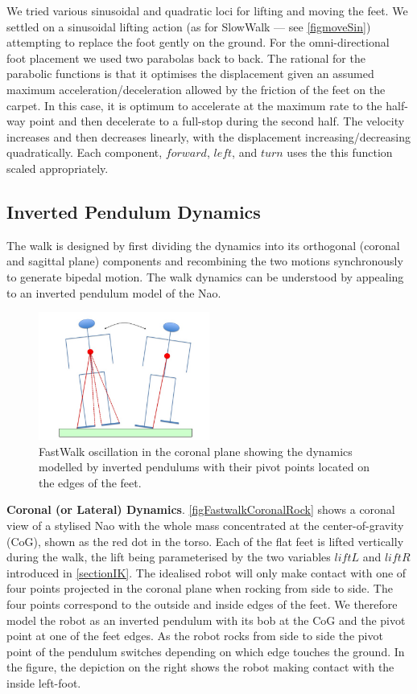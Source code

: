 \documentclass[pdftex,11pt,a4paper]{report}
\begin{document}
We tried various sinusoidal and quadratic loci for lifting and moving the feet. We settled on a sinusoidal lifting action (as for SlowWalk --- see \autoref{figmoveSin}) attempting to replace the foot gently on the ground. For the omni-directional foot placement we used two parabolas back to back. The rational for the parabolic functions is that it optimises the displacement given an assumed maximum acceleration/deceleration allowed by the friction of the feet on the carpet. In this case, it is optimum to accelerate at the maximum rate to the half-way point and then decelerate to a full-stop during the second half. The velocity increases and then decreases linearly, with the displacement increasing/decreasing quadratically. Each component, $forward$, $left$, and $turn$ uses the this function scaled appropriately. 

\subsection{Inverted Pendulum Dynamics}
The walk is designed by first dividing the dynamics into its orthogonal (coronal and sagittal plane) components and recombining the two motions synchronously to generate bipedal motion. The walk dynamics can be understood by appealing to an inverted pendulum model of the Nao. 

\begin{figure}[ht]
\centering
\includegraphics[width=0.5\textwidth]{figures/FastwalkCoronalRock.jpg}
\caption{FastWalk oscillation in the coronal plane showing the dynamics modelled by inverted pendulums with their pivot points located on the edges of the feet.} \label{figFastwalkCoronalRock}
\end{figure}

\textbf{Coronal (or Lateral) Dynamics}. \autoref{figFastwalkCoronalRock} shows a coronal view of a stylised Nao with the whole mass concentrated at the center-of-gravity (CoG), shown as the red dot in the torso. Each of the flat feet is lifted vertically during the walk, the lift being parameterised by the two variables $liftL$ and $liftR$ introduced in \autoref{sectionIK}. The idealised robot will only make contact with one of four points projected in the coronal plane when rocking from side to side. The four points correspond to the outside and inside edges of the feet. We therefore model the robot as an inverted pendulum with its bob at the CoG and the pivot point at one of the feet edges. As the robot rocks from side to side the pivot point of the pendulum switches depending on which edge touches the ground. In the figure, the depiction on the right shows the robot making contact with the inside left-foot. 
\end{document}
